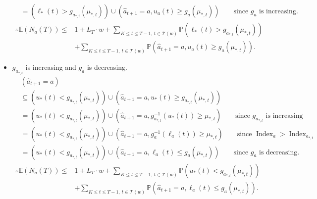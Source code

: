 \documentclass[letterpaper]{article} %
\newcommand{\ArmAt}{\hat{a}}
\newcommand{\IsEqual}{=}
\newcommand{\optArm}[1]{a_{*, #1}}
\newcommand{\optMean}[1]{\mu_{*, #1}}
\newcommand{\noChange}{\mathcal{T}}
\newcommand{\numChanges}{L}
\newcommand{\windowsize}{w}
\begin{document}
\begin{itemize}
\begin{align*}
&= \left(\ell_*(t) > g_{\optArm{t}}(\optMean{t})\right) \cup \left(\ArmAt_{t+1} \IsEqual a, u_a(t) \geq g_a(\optMean{t})\right) \qquad \text{since $g_a$ is increasing.}
\end{align*}
\begin{align}
\label{exp_of_N_eq2}
\therefore \mathds{E}(N_a(T)) \leq &1 + \numChanges_T \cdot \windowsize +  \sum_{K \leq t \leq T-1, \ t \in \noChange(\windowsize)} \mathds{P}\left(\ell_*(t) > g_{\optArm{t}}(\optMean{t})\right) \nonumber \\
%
&+ \sum_{K \leq t \leq T-1, \ t \in \noChange(\windowsize)} \mathds{P}\left(\ArmAt_{t+1} \IsEqual a, u_a(t) \geq g_a(\optMean{t})\right).
\end{align}
\item $g_{\optArm{t}}$ is increasing and $g_a$ is decreasing. %
\begin{align*}
&(\ArmAt_{t+1} \IsEqual a) \\
&\subseteq \left(u_*(t) < g_{\optArm{t}}(\optMean{t})\right) \cup \left(\ArmAt_{t+1} \IsEqual a, u_*(t) \geq g_{\optArm{t}}(\optMean{t})\right) \\
&= \left(u_*(t) < g_{\optArm{t}}(\optMean{t})\right) \cup \left(\ArmAt_{t+1} \IsEqual a, g_{\optArm{t}}^{-1}(u_*(t)) \geq \optMean{t}\right) \qquad \text{since $g_{\optArm{t}}$ is increasing}\\ 
&= \left(u_*(t) < g_{\optArm{t}}(\optMean{t})\right) \cup \left(\ArmAt_{t+1} \IsEqual a, g_a^{-1}(\ell_a(t)) \geq \optMean{t}\right) \qquad \text{since $\operatorname{Index}_a>\operatorname{Index}_{\optArm{t}}$}\\ 
&= \left(u_*(t) < g_{\optArm{t}}(\optMean{t})\right) \cup \left(\ArmAt_{t+1} \IsEqual a, \ell_a(t) \leq g_a(\optMean{t})\right) \qquad \text{since $g_a$ is decreasing.}
\end{align*}
\begin{align}
\label{exp_of_N_eq3}
\therefore \mathds{E}(N_a(T)) \leq &1 + \numChanges_T \cdot \windowsize +  \sum_{K \leq t \leq T-1, \ t \in \noChange(\windowsize)} \mathds{P}\left(u_*(t) < g_{\optArm{t}}(\optMean{t})\right) \nonumber \\
%
&+ \sum_{K \leq t \leq T-1, \ t \in \noChange(\windowsize)} \mathds{P}\left(\ArmAt_{t+1} \IsEqual a, \ell_a(t) \leq g_a(\optMean{t})\right).
\end{align}


\end{itemize}
\end{document}

